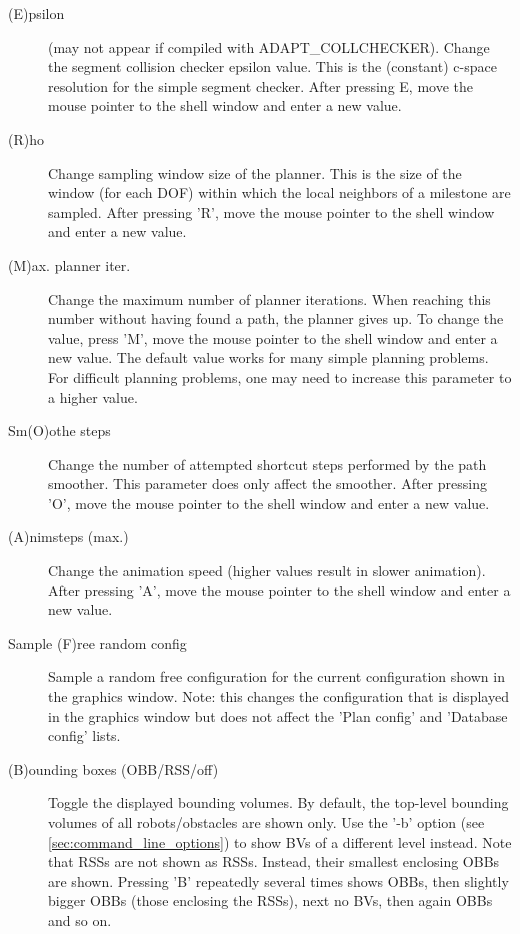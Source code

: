 \documentclass[letter,12pt]{article}
\begin{document}
\begin{description}
\item[(E)psilon] (may not appear if compiled with ADAPT_COLLCHECKER).
  Change the segment collision checker epsilon value.  This is the
  (constant) c-space resolution for the simple segment checker.  After
  pressing E, move the mouse pointer to the shell window and enter a
  new value.
  
\item[(R)ho] Change sampling window size of the planner.  This is the
  size of the window (for each DOF) within which the local neighbors
  of a milestone are sampled.  After pressing 'R', move the mouse
  pointer to the shell window and enter a new value.
  
\item[(M)ax. planner iter.]  Change the maximum number of planner
  iterations.  When reaching this number without having found a path,
  the planner gives up.  To change the value, press 'M', move the mouse
  pointer to the shell window and enter a new value.  The default
  value works for many simple planning problems.  For difficult
  planning problems, one may need to increase this parameter to a
  higher value.
  
\item[Sm(O)othe steps] Change the number of attempted shortcut steps
  performed by the path smoother.  This parameter does only affect the
  smoother.  After pressing 'O', move the mouse pointer to the shell
  window and enter a new value.
  
\item[(A)nimsteps (max.)]  Change the animation speed (higher values
  result in slower animation).  After pressing 'A', move the mouse
  pointer to the shell window and enter a new value.
  
\item[Sample (F)ree random config] Sample a random free configuration
  for the current configuration shown in the graphics window.  Note:
  this changes the configuration that is displayed in the graphics
  window but does not affect the 'Plan config' and 'Database config'
  lists.
  
\item[(B)ounding boxes (OBB/RSS/off)] Toggle the displayed bounding
  volumes.  By default, the top-level bounding volumes of all
  robots/obstacles are shown only.  Use the '-b' option (see
  \ref{sec:command_line_options}) to show BVs of a different level
  instead.  Note that RSSs are not shown as RSSs.  Instead, their
  smallest enclosing OBBs are shown.  Pressing 'B' repeatedly several
  times shows OBBs, then slightly bigger OBBs (those enclosing the
  RSSs), next no BVs, then again OBBs and so on.
  

\end{description}
\end{document}
